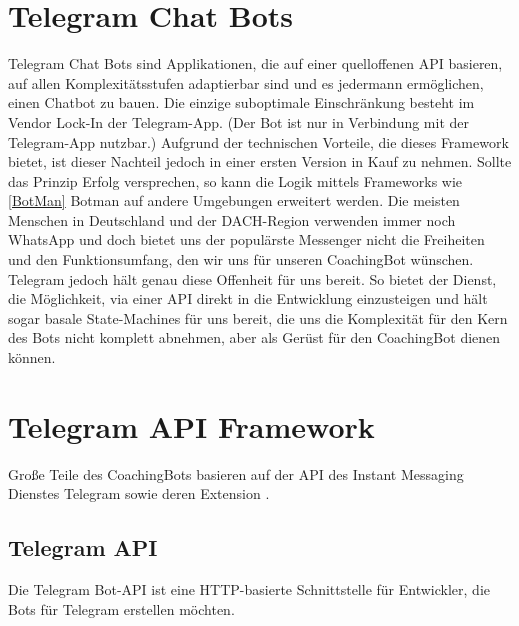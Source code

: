     \section{Telegram Chat Bots}
        Telegram Chat Bots sind Applikationen, die auf einer quelloffenen API \cite{telegramAPI} basieren, auf allen Komplexitätsstufen adaptierbar sind und es jedermann ermöglichen, einen Chatbot zu bauen. Die einzige suboptimale Einschränkung besteht im Vendor Lock-In der Telegram-App. (Der Bot ist nur in Verbindung mit der Telegram-App \cite{telegram} nutzbar.) Aufgrund der technischen Vorteile, die dieses Framework bietet, ist dieser Nachteil jedoch in einer ersten Version in Kauf zu nehmen. Sollte das Prinzip Erfolg versprechen, so kann die Logik mittels Frameworks wie \ref{BotMan} Botman auf andere Umgebungen erweitert werden.
        Die meisten Menschen in Deutschland und der DACH-Region verwenden immer noch WhatsApp \cite{Nutzerzahlen} und doch bietet uns der populärste Messenger nicht die Freiheiten und den Funktionsumfang, den wir uns für unseren CoachingBot wünschen. Telegram jedoch hält genau diese Offenheit für uns bereit. \cite{telegramVergleich} So bietet der Dienst, die Möglichkeit, via einer API direkt in die Entwicklung einzusteigen und hält sogar basale State-Machines für uns bereit, die uns die Komplexität für den Kern des Bots nicht komplett abnehmen, aber als Gerüst für den CoachingBot dienen können.

    \section{Telegram API Framework}
        Große Teile des CoachingBots basieren auf der API des Instant Messaging Dienstes Telegram\cite{telegramAPI} sowie deren Extension \cite{telegramAPIext}. 

        \subsection{Telegram API} \label{Telegram API}
            \glqq Die Telegram Bot-API ist eine HTTP-basierte Schnittstelle für Entwickler, die Bots für Telegram erstellen möchten.\grqq \cite{core_telegram_api} 


